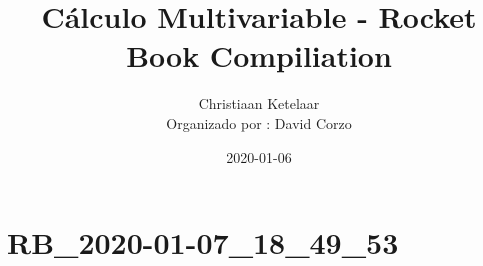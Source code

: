 \documentclass{book}
\title{Cálculo Multivariable  - Rocket Book Compiliation}
\author{Christiaan Ketelaar \\ Organizado por : David Corzo}
\date{2020-01-06}
\begin{document}
\maketitle
\tableofcontents

\chapter{ RB\_2020-01-07\_18\_49\_53 }

\end{document}
